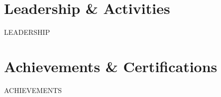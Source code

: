\documentclass[a4paper,10pt]{article}
\newcommand{\resumeSubHeadingListStart}{\begin{itemize}[leftmargin=0.0in, label={}]}
\newcommand{\resumeSubHeadingListEnd}{\end{itemize}}
\newcommand{\resumeItemListStart}{\begin{itemize}}
\newcommand{\resumeItemListEnd}{\end{itemize}\vspace{-5pt}}
\begin{document}
\section{Leadership \& Activities}
  \vspace{-4pt}
    \resumeSubHeadingListStart
{{LEADERSHIP}}
    \resumeSubHeadingListEnd
    \vspace{-8pt}

\section{Achievements \& Certifications}
    \resumeItemListStart
{{ACHIEVEMENTS}}
    \resumeItemListEnd
\end{document}
